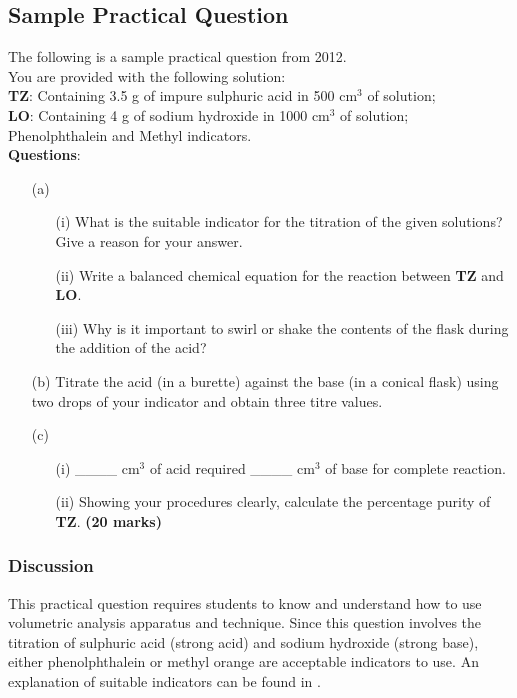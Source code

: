 \subsection{Sample Practical Question}
The following is a sample practical question from 2012.\\


\noindent You are provided with the following solution:\\

\noindent \textbf{TZ}: Containing 3.5 g of impure sulphuric acid in 500 cm$^3$ of solution;\\
\textbf{LO}: Containing 4 g of sodium hydroxide in 1000 cm$^3$ of solution;\\
Phenolphthalein and Methyl indicators.\\

\textbf{Questions}:\\
\begin{enumerate}
\item[(a)]
\begin{enumerate}
\item[(i)] What is the suitable indicator for the titration of the given solutions?\\
Give a reason for your answer.
\item[(ii)] Write a balanced chemical equation for the reaction between \textbf{TZ} and \textbf{LO}.
\item[(iii)] Why is it important to swirl or shake the contents of the flask during the addition of the acid?\\
\end{enumerate}

\item[(b)] Titrate the acid (in a burette) against the base (in a conical flask) using two drops of your indicator and obtain three titre values.\\

\item[(c)] 
\begin{enumerate}
\item[(i)] \_\_\_\_ cm$^3$ of acid required \_\_\_\_ cm$^3$ of base for complete reaction.
\item[(ii)] Showing your procedures clearly, calculate the percentage purity of \textbf{TZ}. \hfill \textbf{(20 marks)}
\end{enumerate}
\end{enumerate}


\subsubsection{Discussion}
This practical question requires students to know and understand how to use volumetric analysis apparatus and technique. Since this question involves the titration of sulphuric acid (strong acid) and sodium hydroxide (strong base), either phenolphthalein or methyl orange are acceptable indicators to use. An explanation of suitable indicators can be found in .

